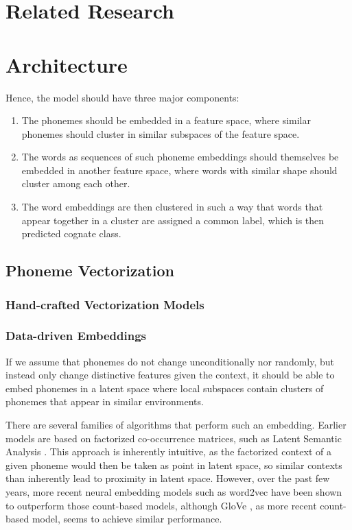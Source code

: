 \documentclass[8pt]{article}
\begin{document}
\section{Related Research}
\section{Architecture}
Hence, the model should have three major components:
\begin{enumerate}
\item The phonemes should be embedded in a feature space, where similar phonemes should cluster in similar subspaces of the feature space. 
\item The words as sequences of such phoneme embeddings should themselves be embedded in another feature space, where words with similar shape should cluster among each other. 
\item The word embeddings are then clustered in such a way that words that appear together in a cluster are assigned a common label, which is then predicted cognate class.
\end{enumerate}

\subsection{Phoneme Vectorization}
\subsubsection{Hand-crafted Vectorization Models}
\subsubsection{Data-driven Embeddings}




If we assume that phonemes do not change unconditionally nor randomly, but instead only change distinctive features given the context, it should be able to embed phonemes in a latent space where local subspaces contain clusters of phonemes that appear in similar environments. 

There are several families of algorithms that perform such an embedding. Earlier models are based on factorized co-occurrence matrices, such as Latent Semantic Analysis \cite{landauer2013handbook}. This approach is inherently intuitive, as the factorized context of a given phoneme would then be taken as point in latent space, so similar contexts than inherently lead to proximity in latent space. However, over the past few years, more recent neural embedding models such as word2vec \cite{mikolov2013efficient,mikolov2013distributed,goldberg2014word2vec}  have been shown to outperform those count-based models, although GloVe \cite{pennington2014glove}, as more recent count-based model, seems to achieve similar performance.
\end{document}
